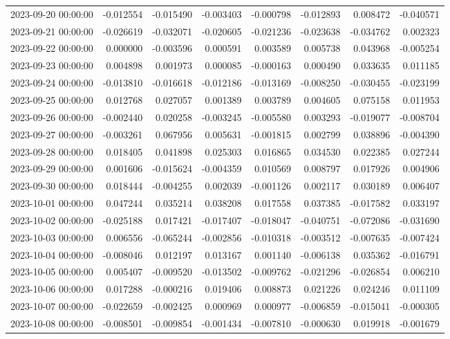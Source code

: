\begin{tabular}{lrrrrrrr}
2023-09-20 00:00:00 & -0.012554 & -0.015490 & -0.003403 & -0.000798 & -0.012893 & 0.008472 & -0.040571 \\
2023-09-21 00:00:00 & -0.026619 & -0.032071 & -0.020605 & -0.021236 & -0.023638 & -0.034762 & 0.002323 \\
2023-09-22 00:00:00 & 0.000000 & -0.003596 & 0.000591 & 0.003589 & 0.005738 & 0.043968 & -0.005254 \\
2023-09-23 00:00:00 & 0.004898 & 0.001973 & 0.000085 & -0.000163 & 0.000490 & 0.033635 & 0.011185 \\
2023-09-24 00:00:00 & -0.013810 & -0.016618 & -0.012186 & -0.013169 & -0.008250 & -0.030455 & -0.023199 \\
2023-09-25 00:00:00 & 0.012768 & 0.027057 & 0.001389 & 0.003789 & 0.004605 & 0.075158 & 0.011953 \\
2023-09-26 00:00:00 & -0.002440 & 0.020258 & -0.003245 & -0.005580 & 0.003293 & -0.019077 & -0.008704 \\
2023-09-27 00:00:00 & -0.003261 & 0.067956 & 0.005631 & -0.001815 & 0.002799 & 0.038896 & -0.004390 \\
2023-09-28 00:00:00 & 0.018405 & 0.041898 & 0.025303 & 0.016865 & 0.034530 & 0.022385 & 0.027244 \\
2023-09-29 00:00:00 & 0.001606 & -0.015624 & -0.004359 & 0.010569 & 0.008797 & 0.017926 & 0.004906 \\
2023-09-30 00:00:00 & 0.018444 & -0.004255 & 0.002039 & -0.001126 & 0.002117 & 0.030189 & 0.006407 \\
2023-10-01 00:00:00 & 0.047244 & 0.035214 & 0.038208 & 0.017558 & 0.037385 & -0.017582 & 0.033197 \\
2023-10-02 00:00:00 & -0.025188 & 0.017421 & -0.017407 & -0.018047 & -0.040751 & -0.072086 & -0.031690 \\
2023-10-03 00:00:00 & 0.006556 & -0.065244 & -0.002856 & -0.010318 & -0.003512 & -0.007635 & -0.007424 \\
2023-10-04 00:00:00 & -0.008046 & 0.012197 & 0.013167 & 0.001140 & -0.006138 & 0.035362 & -0.016791 \\
2023-10-05 00:00:00 & 0.005407 & -0.009520 & -0.013502 & -0.009762 & -0.021296 & -0.026854 & 0.006210 \\
2023-10-06 00:00:00 & 0.017288 & -0.000216 & 0.019406 & 0.008873 & 0.021226 & 0.024246 & 0.011109 \\
2023-10-07 00:00:00 & -0.022659 & -0.002425 & 0.000969 & 0.000977 & -0.006859 & -0.015041 & -0.000305 \\
2023-10-08 00:00:00 & -0.008501 & -0.009854 & -0.001434 & -0.007810 & -0.000630 & 0.019918 & -0.001679 \\

\end{tabular}
